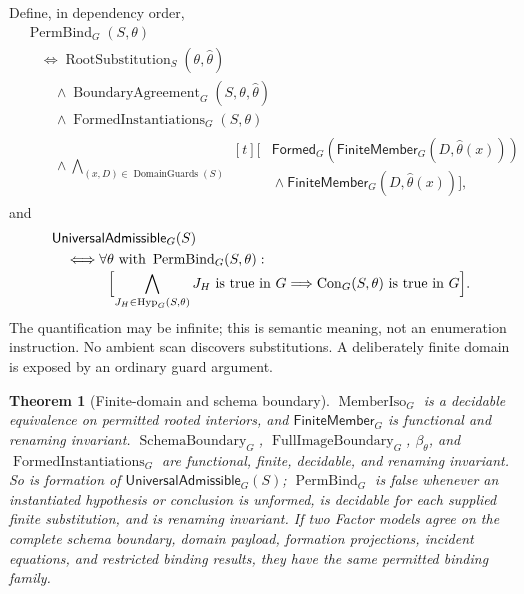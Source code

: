 \documentclass[11pt,twoside]{article}
\newcommand{\Formed}{\mathsf{Formed}}
\newcommand{\FiniteMember}{\mathsf{FiniteMember}}
\newcommand{\UniversalAdmissible}{\mathsf{UniversalAdmissible}}
\newtheorem{theorem}{Theorem}
\begin{document}
Define, in dependency order,
\[
\begin{aligned}
 &\operatorname{PermBind}_G(S,\theta)\\
 &\quad\Longleftrightarrow
 \operatorname{RootSubstitution}_S(\theta,\widehat\theta)\\
 &\qquad{}\land
 \operatorname{BoundaryAgreement}_G(S,\theta,\widehat\theta)\\
 &\qquad{}\land
 \operatorname{FormedInstantiations}_G(S,\theta)\\
 &\qquad{}\land
 \bigwedge_{(x,D)\in\operatorname{DomainGuards}(S)}
 \begin{aligned}[t]
   [&\Formed_G(\FiniteMember_G(D,\widehat\theta(x)))\\[-0.2em]
    &{}\land\FiniteMember_G(D,\widehat\theta(x))],
 \end{aligned}
\end{aligned}
\]
and
\[
\begin{aligned}
 &\UniversalAdmissible_G(S)\\
 &\quad\Longleftrightarrow
 \forall\theta\text{ with }\operatorname{PermBind}_G(S,\theta):\\[-0.2em]
 &\hspace{4em}\Bigl[
  \bigwedge_{J_H\in\operatorname{Hyp}_G(S,\theta)}
          J_H\text{ is true in }G
  \Longrightarrow
  \operatorname{Con}_G(S,\theta)\text{ is true in }G
 \Bigr].
\end{aligned}
\]
The quantification may be infinite; this is semantic meaning, not an enumeration
instruction.  No ambient scan discovers substitutions.  A deliberately finite
domain is exposed by an ordinary guard argument.

\begin{theorem}[Finite-domain and schema boundary]\label{thm:schema}
\(\operatorname{MemberIso}_G\) is a decidable equivalence on permitted rooted
interiors, and \(\FiniteMember_G\) is functional and renaming invariant.
\(\operatorname{SchemaBoundary}_G\),
\(\operatorname{FullImageBoundary}_G\), \(\beta_\theta\), and
\(\operatorname{FormedInstantiations}_G\) are functional, finite, decidable, and
renaming invariant.  So is formation of
\(\UniversalAdmissible_G(S)\); \(\operatorname{PermBind}_G\) is false whenever an
instantiated hypothesis or conclusion is unformed, is decidable for each supplied
finite substitution, and is renaming invariant.  If two Factor models agree on the
complete schema boundary, domain payload, formation projections, incident
equations, and restricted binding results, they have the same permitted binding
family.
\end{theorem}
\end{document}
